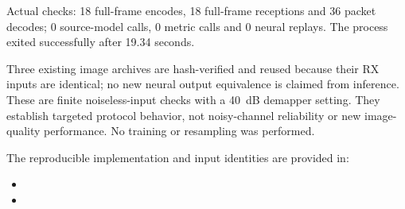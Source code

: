 \documentclass[11pt,letterpaper]{article}
\begin{document}
Actual checks: 18 full-frame encodes, 18 full-frame receptions and 36 packet decodes; 0 source-model calls, 0 metric calls and 0 neural replays. The process exited successfully after 19.34 seconds.

Three existing image archives are hash-verified and reused because their RX inputs are identical; no new neural output equivalence is claimed from inference. These are finite noiseless-input checks with a 40~dB demapper setting. They establish targeted protocol behavior, not noisy-channel reliability or new image-quality performance. No training or resampling was performed.

The reproducible implementation and input identities are provided in:
\begin{itemize}
\item {}
\item {}
\end{itemize}
\end{document}
